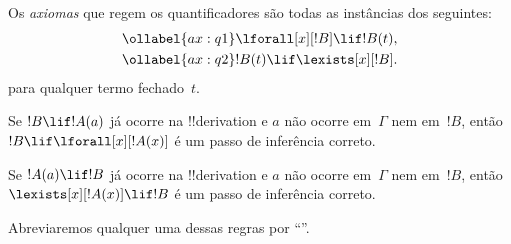 \documentclass[../../../include/open-logic-section]{subfiles}
\begin{document}


\begin{defn}
Os \emph{axiomas} que regem os quantificadores são
todas as instâncias dos seguintes:
\begin{align}
\ollabel{ax:q1} & \lforall[x][!B] \lif !B(t), \\
\ollabel{ax:q2} & !B(t) \lif \lexists[x][!B].
\end{align}
para qualquer termo fechado~$t$.
\end{defn}

\begin{defn}
\item Se $!B \lif !A(a)$ já ocorre na !!{derivation} e $a$
  não ocorre em~$\Gamma$ nem em~$!B$, então $!B \lif
  \lforall[x][!A(x)]$ é um passo de inferência correto.
\item Se $!A(a) \lif !B$ já ocorre na !!{derivation} e $a$
  não ocorre em~$\Gamma$ nem em~$!B$, então $\lexists[x][!A(x)] \lif
  !B$ é um passo de inferência correto.
\end{defn}

Abreviaremos qualquer uma dessas regras por ``\QR''.
\end{document}
